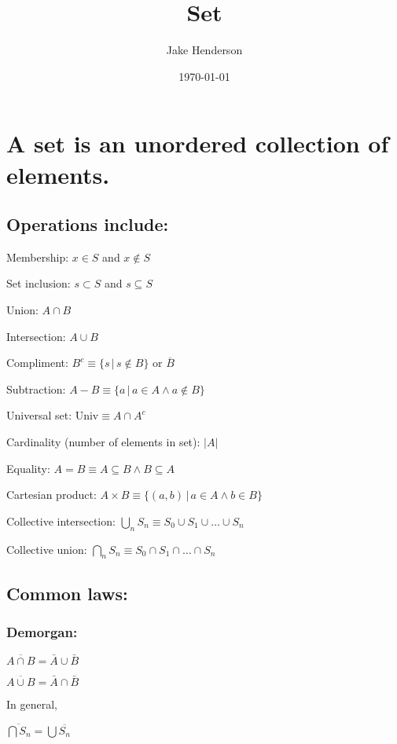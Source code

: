 \documentclass[11pt]{article}
\author{Jake Henderson}
\date{\today}
\title{Set}
\begin{document}
\maketitle
\tableofcontents


\section{A set is an unordered collection of elements.}
\label{sec:org5d46f09}
\subsection{Operations include:}
\label{sec:org03997d2}

Membership: \(x \in S\) and \(x \notin S\)

Set inclusion: \(s \subset S\) and \(s \subseteq S\)

Union: \(A \cap B\)

Intersection: \(A \cup B\)

Compliment: \(B^c \equiv \{s\, | \, s \notin B\}\) or \(\overline{B}\)

Subtraction: \(A - B \equiv \{ a \, | \, a \in A \land a \notin B \}\)

Universal set: \(\text{Univ} \equiv A \cap A^c\)

Cardinality (number of elements in set): \(|A|\)

Equality: \(A = B \equiv A \subseteq B \land  B \subseteq A\)

Cartesian product: \(A \times B \equiv \{(a,b) \, | \, a \in A \land b \in B\}\)

Collective intersection: \(\bigcup_{n} S_n \equiv S_0 \cup S_1 \cup \dots \cup S_n\)

Collective union: \(\bigcap_n S_n \equiv S_0 \cap S_1 \cap \dots \cap S_n\)

\subsection{Common laws:}
\label{sec:org36f46e7}
\subsubsection{Demorgan:}
\label{sec:org3ccb392}

\(\overline{A \cap B} = \bar{A} \cup \bar{B}\)

\(\overline{A \cup B} = \bar{A} \cap \bar{B}\)

In general,

\(\overline{\bigcap S_n} = \bigcup{\overline{S_n}}\)
\end{document}
